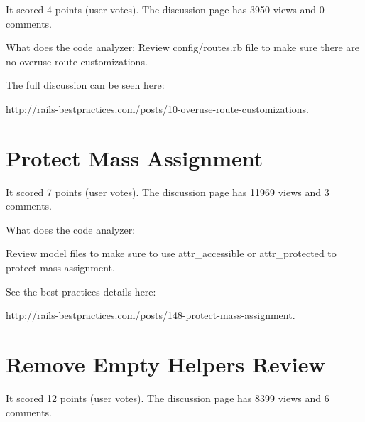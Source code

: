 It scored 4 points (user votes). 
The discussion page has 3950 views and 0 comments.

What does the code analyzer:
Review config/routes.rb file to make sure there are no overuse route customizations.

The full discussion can be seen here:

\url{http://rails-bestpractices.com/posts/10-overuse-route-customizations.}

   
\section{Protect Mass Assignment}


It scored 7 points (user votes). 
The discussion page has 11969 views and 3 comments.

What does the code analyzer:

Review model files to make sure to use attr\_accessible or attr\_protected to protect mass assignment.
 
See the best practices details here:

\url{http://rails-bestpractices.com/posts/148-protect-mass-assignment.}

\section{Remove Empty Helpers Review}


It scored 12 points (user votes). 
The discussion page has 8399 views and 6 comments.

